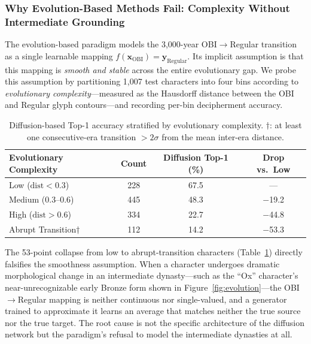 \documentclass{article}
\begin{document}
\subsubsection{Why Evolution-Based Methods Fail: Complexity Without Intermediate Grounding}
\label{sec:pre:s2}

The evolution-based paradigm models the 3,000-year OBI$\to$Regular transition as a single learnable mapping $f(\mathbf{x}_{\text{OBI}}) = \mathbf{y}_{\text{Regular}}$. Its implicit assumption is that this mapping is \emph{smooth and stable} across the entire evolutionary gap. We probe this assumption by partitioning 1,007 test characters into four bins according to \emph{evolutionary complexity}—measured as the Hausdorff distance between the OBI and Regular glyph contours—and recording per-bin decipherment accuracy.

\begin{table}[h]
  \centering
  \caption{Diffusion-based Top-1 accuracy stratified by evolutionary complexity. $\dagger$: at least one consecutive-era transition $>2\sigma$ from the mean inter-era distance.}
  \label{tab:pre:s2}
  \begin{tabular}{lccc}
    \toprule
    \textbf{Evolutionary Complexity} & \textbf{Count} &
    \textbf{Diffusion Top-1 (\%)} & \textbf{Drop vs.\ Low} \\
    \midrule
    Low ($\text{dist} < 0.3$)         & 228 & 67.5 & — \\
    Medium ($0.3$–$0.6$)              & 445 & 48.3 & $-$19.2 \\
    High ($\text{dist} > 0.6$)        & 334 & 22.7 & $-$44.8 \\
    Abrupt Transition$\dagger$         & 112 & 14.2 & $-$53.3 \\
    \bottomrule
  \end{tabular}
\end{table}

The 53-point collapse from low to abrupt-transition characters (Table~\ref{tab:pre:s2}) directly falsifies the smoothness assumption. When a character undergoes dramatic morphological change in an intermediate dynasty—such as the ``Ox'' character's near-unrecognizable early Bronze form shown in Figure~\ref{fig:evolution}—the OBI$\to$Regular mapping is neither continuous nor single-valued, and a generator trained to approximate it learns an average that matches neither the true source nor the true target. The root cause is not the specific architecture of the diffusion network but the paradigm's refusal to model the intermediate dynasties at all.
\end{document}
